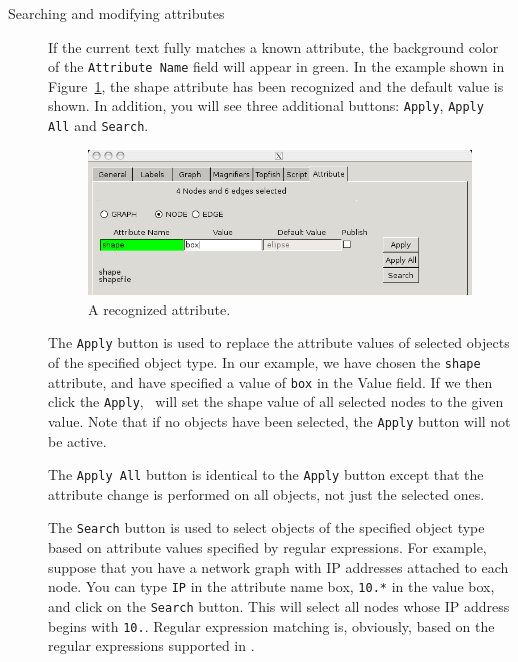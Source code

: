 \begin{description}
\item[Searching and modifying attributes]
If the current text fully matches a known attribute,
the background color of the {\tt Attribute Name} field will appear in green. 
In the example shown in Figure~\ref{fig:attr3}, the shape attribute has been
recognized and the default value is shown. 
In addition, you will see three additional buttons: {\tt Apply}, {\tt Apply All} and {\tt Search}.

\begin{figure}[ht]
\begin{center}
\includegraphics[scale=.5]{figures/attr3.png}
\caption{\small A recognized attribute.}
\label{fig:attr3}
\end{center}
\end{figure}

The {\tt Apply} button is used to replace the attribute values of selected objects of the 
specified object type. In our example, we have chosen the {\tt shape} attribute, 
and have specified a value of {\tt box} in the Value field. If we then click the {\tt Apply},
\smyrna\ will set the shape value of all selected nodes to the given value.
Note that if no objects have been selected, the {\tt Apply} button will not be active.

The {\tt Apply All} button is identical to the {\tt Apply} button except that the
attribute change is performed on all objects, not just the selected ones.

The {\tt Search} button is used to select objects of the specified object type based on
attribute values specified by regular expressions.
For example, suppose that you have a network graph with IP addresses 
attached to each node. You can type {\tt IP} in the attribute name box, {\tt 10.*} in the
value box, and click on the {\tt Search} button. 
This will select all nodes whose IP address begins with {\tt 10.}. Regular expression
matching is, obviously, based on the regular expressions supported in \gvpr.


\end{description}
